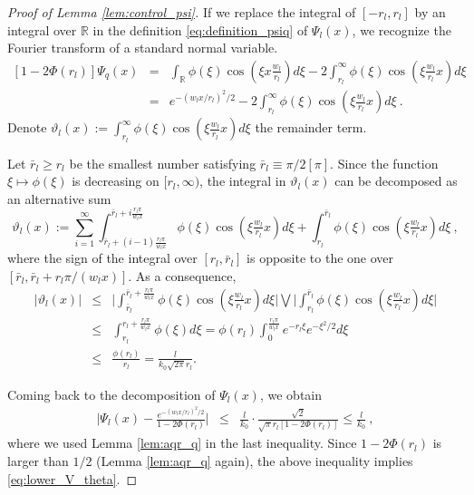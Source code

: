\documentclass[twoside,11pt]{article}
\def\beqn{\begin{eqnarray*}}
\def\eeqn{\end{eqnarray*}}
\newcommand{\<}{\langle}
\renewcommand{\>}{\rangle}
\begin{document}
 
 
 
 
 
 
  \begin{proof}[Proof of Lemma \ref{lem:control_psi}]
  
 
If we replace the integral of $[-r_{l},r_{l}]$ by an integral over $\mathbb{R}$ in the definition \eqref{eq:definition_psiq} of $\Psi_l(x)$, we recognize the Fourier transform of a standard normal variable.
 \begin{eqnarray}\nonumber
[1-2\Phi(r_{l})]\Psi_q(x)&= &\int_{\mathbb{R}} \phi(\xi)\cos(\xi x \frac{w_l}{r_{l}} )d\xi- 2 \int_{r_{l}}^{\infty} \phi(\xi)\cos(\xi \tfrac{w_l}{r_{l}} x)d\xi\\ &=&   e^{-(w_lx/r_{l})^2/2} -2 \int_{r_{l}}^{\infty} \phi(\xi)\cos(\xi \tfrac{w_l}{r_{l}} x)d\xi\ . \label{eq:decomposition_psiq}
 \end{eqnarray}
Denote $\vartheta_l(x):= \int_{r_{l}}^{\infty} \phi(\xi)\cos(\xi \tfrac{w_l}{r_{l}} x)d\xi$ the remainder term.
 

 Let $\bar{r}_l\geq r_{l} $ be the smallest number satisfying $ \bar{r}_l  \equiv \pi/2 [\pi]$.
Since the function $\xi\mapsto \phi(\xi)$ is decreasing on $[r_{l},\infty)$, the integral in $\vartheta_l(x)$ can be decomposed as an alternative sum
\[\vartheta_l(x):=  \sum_{i=1}^{\infty} \int_{\bar{r}_l+(i-1)\frac{r_{l}\pi}{w_lx}}^{\bar{r}_l+ i\frac{r_{l}\pi}{w_lx}}\phi(\xi) \cos(\xi \tfrac{w_l}{r_{l}} x)d\xi+ \int_{r_{l}}^{\bar{r}_l}\phi(\xi) \cos(\xi \tfrac{w_l}{r_{l}} x)d\xi \ , \]
where the sign of the integral over $[r_{l},\bar{r}_l]$ is opposite to the one over $[\bar{r}_l, \bar{r}_l+ r_{l}\pi/(w_lx)]$. As a consequence, 
\begin{eqnarray}\nonumber
\big|\vartheta_l(x)\big|&\leq & \Big|\int_{\bar{r}_l}^{\bar{r}_l+ \frac{r_{l}\pi}{w_lx}}\phi(\xi) \cos(\xi \tfrac{w_l}{r_{l}} x)d\xi\Big|\bigvee \Big|\int_{r_{l}}^{\bar{r}_l}\phi(\xi) \cos(\xi \tfrac{w_l}{r_{l}} x)d\xi \Big|\\ \nonumber
&\leq & \int_{r_{l}}^{r_{l} + \frac{r_{l}\pi}{w_lx}}\phi(\xi)d\xi
 =\phi(r_{l})\int_0^{\frac{r_{l}\pi}{w_lx}} e^{-r_{l} \xi }e^{-\xi^2/2} d\xi\\ 
 &\leq & \frac{\phi(r_{l})}{r_{l}}= \frac{l}{k_0\sqrt{2\pi}r_{l}}. \label{eq:upper_vareta}
\end{eqnarray}

Coming back to the decomposition of $\Psi_l(x)$, we obtain
\beqn 
\big|\Psi_l(x)- \frac{e^{-(w_lx/r_{l})^2/2}}{1-2\Phi(r_{l})}\big|   &\leq & \frac{l}{k_0}\cdot \frac{\sqrt{2}}{\sqrt{\pi}r_{l}[1-2\Phi(r_{l})]} \leq   \frac{l}{k_0}\ ,
\eeqn 
where we used Lemma \ref{lem:aqr_q} in the last inequality. Since $1-2\Phi(r_{l})$ is larger than $1/2$ (Lemma \ref{lem:aqr_q} again), the above inequality implies  \eqref{eq:lower_V_theta}.  



 \end{proof}
 
\end{document}
